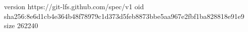 version https://git-lfs.github.com/spec/v1
oid sha256:8e6d1cb4e364b48f78979c1d373d5feb8873bbe5aa967e2fbf1ba828818e91e9
size 262240
